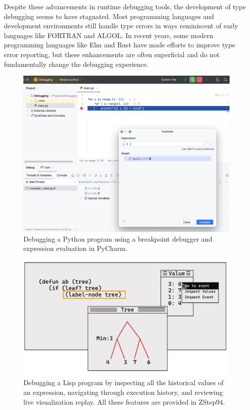 Despite these advancements in runtime debugging tools, the development of type debugging seems to have stagnated. Most programming languages and development environments still handle type errors in ways reminiscent of early languages like FORTRAN and ALGOL. In recent years, some modern programming languages like Elm and Rust have made efforts to improve type error reporting, but these enhancements are often superficial and do not fundamentally change the debugging experience.


\begin{figure}[hbt]
  \includegraphics[width=\linewidth]{BreakPoint}
  \caption{
    \label{fig:breakpoint}
    Debugging a Python program using a breakpoint debugger and expression evaluation in PyCharm.
    }
\end{figure}


\begin{figure}[hbt]
  \includegraphics[width=\linewidth]{ZStep94}
  \caption{
    \label{fig:zstep94}
    Debugging a Lisp program by inspecting all the historical values of an expression, navigating through execution history, and reviewing live visualization replay.  All these features are provided in ZStep94.
    }
\end{figure}

